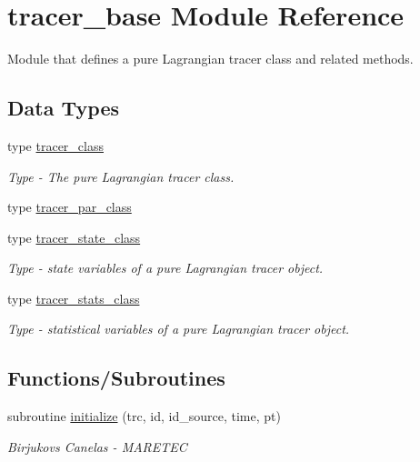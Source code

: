 \hypertarget{namespacetracer__base}{}\section{tracer\+\_\+base Module Reference}
\label{namespacetracer__base}


Module that defines a pure Lagrangian tracer class and related methods.  


\subsection*{Data Types}
\begin{DoxyCompactItemize}
\item 
type \hyperlink{structtracer__base_1_1tracer__class}{tracer\+\_\+class}
\begin{DoxyCompactList}\small\item\em Type -\/ The pure Lagrangian tracer class. \end{DoxyCompactList}\item 
type \hyperlink{structtracer__base_1_1tracer__par__class}{tracer\+\_\+par\+\_\+class}
\item 
type \hyperlink{structtracer__base_1_1tracer__state__class}{tracer\+\_\+state\+\_\+class}
\begin{DoxyCompactList}\small\item\em Type -\/ state variables of a pure Lagrangian tracer object. \end{DoxyCompactList}\item 
type \hyperlink{structtracer__base_1_1tracer__stats__class}{tracer\+\_\+stats\+\_\+class}
\begin{DoxyCompactList}\small\item\em Type -\/ statistical variables of a pure Lagrangian tracer object. \end{DoxyCompactList}\end{DoxyCompactItemize}
\subsection*{Functions/\+Subroutines}
\begin{DoxyCompactItemize}
\item 
subroutine \hyperlink{namespacetracer__base_ad712d20080a9daa44024d61afae670a4}{initialize} (trc, id, id\+\_\+source, time, pt)
\begin{DoxyCompactList}\small\item\em Birjukovs Canelas -\/ M\+A\+R\+E\+T\+EC \end{DoxyCompactList}\end{DoxyCompactItemize}
